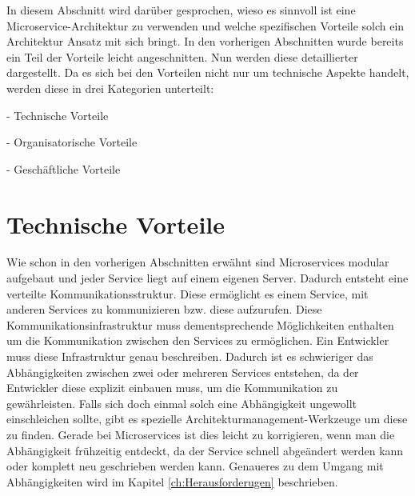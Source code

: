 In diesem Abschnitt wird darüber gesprochen, wieso es sinnvoll ist eine Microservice-Architektur zu verwenden und welche spezifischen Vorteile solch ein Architektur Ansatz mit sich bringt.
In den vorherigen Abschnitten wurde bereits ein Teil der Vorteile leicht angeschnitten. Nun werden diese detaillierter dargestellt.
Da es sich bei den Vorteilen nicht nur um technische Aspekte handelt, werden diese in drei Kategorien unterteilt:
\begin{description}
	\item - Technische Vorteile
	\item - Organisatorische Vorteile
	\item - Geschäftliche Vorteile
\end{description}

\section{Technische Vorteile}

Wie schon in den vorherigen Abschnitten erwähnt sind Microservices modular aufgebaut und jeder Service liegt auf einem eigenen Server. Dadurch entsteht eine verteilte Kommunikationsstruktur. Diese ermöglicht es einem Service, mit anderen Services zu kommunizieren bzw. diese aufzurufen. Diese Kommunikationsinfrastruktur muss dementsprechende Möglichkeiten enthalten um die Kommunikation zwischen den Services zu ermöglichen. Ein Entwickler muss diese Infrastruktur genau beschreiben. Dadurch ist es schwieriger das Abhängigkeiten zwischen zwei oder mehreren Services entstehen, da der Entwickler diese explizit einbauen muss, um die Kommunikation zu gewährleisten. Falls sich doch einmal solch eine Abhängigkeit ungewollt einschleichen sollte, gibt es  spezielle Architekturmanagement-Werkzeuge um diese zu finden. Gerade bei Microservices ist dies leicht zu korrigieren, wenn man die Abhängigkeit frühzeitig entdeckt, da der Service schnell abgeändert werden kann oder komplett neu geschrieben werden kann. Genaueres zu dem Umgang mit Abhängigkeiten wird im Kapitel \ref{ch:Herausforderugen} beschrieben.\cite{microservices}\newline\newline


